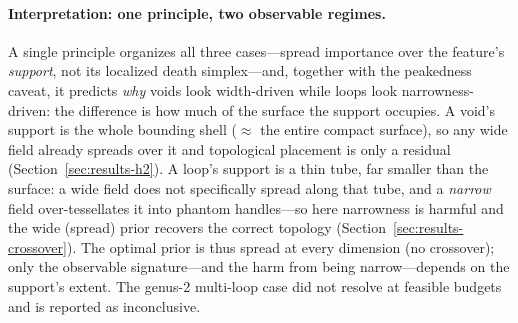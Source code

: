 \paragraph{Interpretation: one principle, two observable regimes.}
A single principle organizes all three cases---spread importance over the feature's
\emph{support}, not its localized death simplex---and, together with the peakedness
caveat, it predicts \emph{why} voids look width-driven while loops look
narrowness-driven: the difference is how much of the surface the support occupies. A
void's support is the whole bounding shell ($\approx$ the entire compact surface), so
any wide field already spreads over it and topological placement is only a residual
(Section~\ref{sec:results-h2}). A loop's support is a thin tube, far smaller than the
surface: a wide field does not specifically spread along that tube, and a \emph{narrow}
field over-tessellates it into phantom handles---so here narrowness is harmful and the
wide (spread) prior recovers the correct topology (Section~\ref{sec:results-crossover}).
The optimal prior is thus spread at every dimension (no crossover); only the observable
signature---and the harm from being narrow---depends on the support's extent. The
genus-2 multi-loop case did not resolve at feasible budgets and is reported as
inconclusive.
